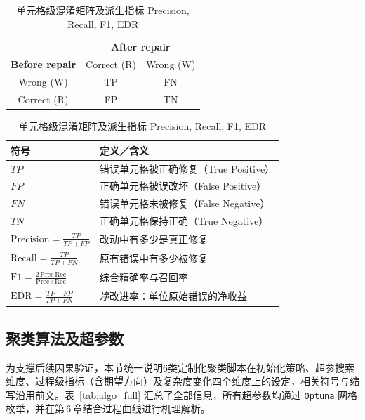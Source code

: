 \documentclass[10pt]{article} %
\numberwithin{equation}{section}
\begin{document}
\begin{table}[ht]
\small\centering
\setlength{\tabcolsep}{6pt}
\renewcommand{\arraystretch}{1.1}
\begin{tabular}{c|cc}
\toprule
 & \multicolumn{2}{c}{\textbf{After repair}}\\\cline{2-3}
\textbf{Before repair} & Correct (R) & Wrong (W)\\\hline
Wrong (W) & TP & FN\\
Correct (R) & FP & TN\\
\bottomrule
\end{tabular}

\vspace{0.6em}
\begin{tabular}{@{}lp{9.5cm}@{}}
\toprule
\textbf{符号} & \textbf{定义／含义} \\
\midrule
$TP$ & 错误单元格被正确修复（True Positive）\\
$FP$ & 正确单元格被误改坏（False Positive）\\
$FN$ & 错误单元格未被修复（False Negative）\\
$TN$ & 正确单元格保持正确（True Negative）\\
\midrule
$\displaystyle\text{Precision}=\frac{TP}{TP+FP}$ &
改动中有多少是真正修复 \\[4pt]
$\displaystyle\text{Recall}=\frac{TP}{TP+FN}$ &
原有错误中有多少被修复 \\[4pt]
$\displaystyle\text{F1}=\frac{2\,\text{Prec}\,\text{Rec}}{\text{Prec}+\text{Rec}}$ &
综合精确率与召回率 \\[6pt]
$\displaystyle\text{EDR}=\frac{TP-FP}{TP+FN}$ &
\emph{净}改进率：单位原始错误的净收益 \\
\bottomrule
\end{tabular}
\caption{单元格级混淆矩阵及派生指标 Precision, Recall, F1, EDR}
\label{tab:cell-metrics-def}
\end{table}

\subsection{聚类算法及超参数}\label{sec:clu_algo}

\textcolor[rgb]{0.00,0.07,1.00}{为支撑后续因果验证，本节统一说明6类定制化聚类脚本在初始化策略、超参搜索维度、过程级指标（含期望方向）及复杂度变化四个维度上的设定，相关符号与缩写沿用前文。表~\ref{tab:algo_full} 汇总了全部信息，所有超参数均通过 \texttt{Optuna} 网格枚举，并在第\,6\,章结合过程曲线进行机理解析。}
\end{document}
